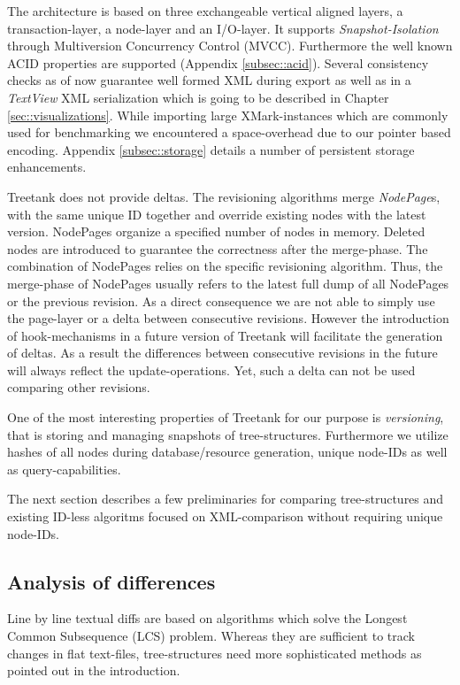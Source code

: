 The architecture is based on three exchangeable vertical aligned layers, a transaction-layer, a node-layer and an I/O-layer. It supports \emph{Snapshot-Isolation} through Multiversion Concurrency Control (MVCC). Furthermore the well known ACID properties are supported (Appendix \ref{subsec::acid}). Several consistency checks as of now guarantee well formed XML during export as well as in a \emph{TextView} XML serialization which is going to be described in Chapter \ref{sec::visualizations}. While importing large XMark-instances \cite{XMark} which are commonly used for benchmarking we encountered a space-overhead due to our pointer based encoding. Appendix \ref{subsec::storage} details a number of persistent storage enhancements.

Treetank does not provide deltas. The revisioning algorithms merge \emph{NodePage}s, with the same unique ID together and override existing nodes with the latest version.  NodePages organize a specified number of nodes in memory. Deleted nodes are introduced to guarantee the correctness after the merge-phase. The combination of NodePages relies on the specific revisioning algorithm. Thus, the merge-phase of NodePages usually refers to the latest full dump of all NodePages or the previous revision. As a direct consequence we are not able to simply use the page-layer or a delta between consecutive revisions. However the introduction of hook-mechanisms in a future version of Treetank will facilitate the generation of deltas. As a result the differences between consecutive revisions in the future will always reflect the update-operations. Yet, such a delta can not be used comparing other revisions.

One of the most interesting properties of Treetank for our purpose is \emph{versioning}, that is storing and managing snapshots of tree-structures. Furthermore we utilize hashes of all nodes during database/resource generation, unique node-IDs as well as query-capabilities.

The next section describes a few preliminaries for comparing tree-structures and existing ID-less algoritms focused on XML-comparison without requiring unique node-IDs.

\subsection{Analysis of differences}
Line by line textual diffs are based on algorithms which solve the Longest Common Subsequence (LCS) problem. Whereas they are sufficient to track changes in flat text-files, tree-structures need more sophisticated methods as pointed out in the introduction.

